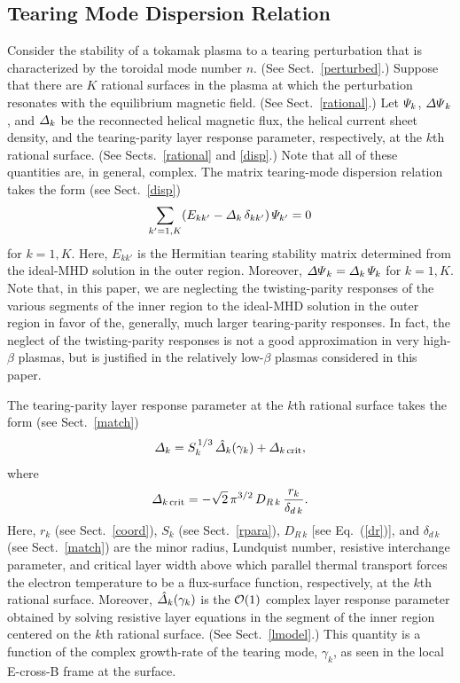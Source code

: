 \documentclass[12pt,prb,aps]{revtex4-1}
\begin{document}
\subsection{Tearing Mode Dispersion Relation}
Consider the stability of a tokamak plasma to a tearing perturbation that is characterized by the toroidal mode number $n$. (See Sect.~\ref{perturbed}.)
Suppose that there are $K$ rational surfaces in the plasma at which the perturbation resonates with the equilibrium magnetic field. (See Sect.~\ref{rational}.)
Let ${\mit\Psi}_k$, ${\mit\Delta\Psi}_k$, and ${\mit\Delta}_k$ be the reconnected helical magnetic flux, the helical current sheet density, and the
tearing-parity layer response parameter, respectively, at the $k$th rational surface. (See Sects.~\ref{rational} and \ref{disp}.) Note that all of these
quantities are, in general, complex. The matrix tearing-mode dispersion relation takes the form (see Sect.~\ref{disp}) 
\begin{equation}\label{tmdisp}
\sum_{k'=1,K}(E_{kk'}-{\mit\Delta}_k\,\delta_{kk'})\,{\mit\Psi}_{k'} = 0
\end{equation}
for $k=1,K$. Here, $E_{kk'}$ is the Hermitian tearing stability matrix determined from the ideal-MHD solution in the outer region. 
Moreover, ${\mit\Delta\Psi}_k = {\mit\Delta}_k\,{\mit\Psi}_k$ for $k=1,K$. Note that, in this paper, we are neglecting the twisting-parity responses of the
various segments of the inner region to the ideal-MHD solution in the outer region in favor of the, generally, much larger tearing-parity responses.\cite{am3}
In fact, the neglect of the twisting-parity responses   is not a good approximation in very high-$\beta$ plasmas,\cite{bren2} but is justified in the relatively low-$\beta$
plasmas considered in this paper. 

The tearing-parity layer response parameter at the $k$th rational surface takes the form (see Sect.~\ref{match})
\begin{equation}
{\mit\Delta}_k = S_k^{\,1/3}\,\hat{\mit\Delta}_k(\gamma_k) + {\mit\Delta}_{k\,{\rm crit}},
\end{equation}
where
\begin{equation}\label{dcrit}
{\mit\Delta}_{k\,{\rm crit}} =- \sqrt{2}\,\pi^{3/2}\,D_{R\,k}\,\frac{r_k}{\delta_{d\,k}}.
\end{equation}
Here, $r_k$ (see Sect.~\ref{coord}), $S_k$ (see Sect.~\ref{rpara}), $D_{R\,k}$ [see Eq.~(\ref{dr})], and $\delta_{d\,k}$ (see Sect.~\ref{match}) are the minor radius,  Lundquist number, resistive interchange parameter, and critical layer width above
which parallel thermal transport forces the electron temperature to be a flux-surface function, respectively, at the $k$th rational surface.  Moreover, $\hat{\mit\Delta}_k(\gamma_k)$ is
the ${\cal O}(1)$ complex layer response parameter obtained by solving  resistive layer equations in the segment of the inner region centered on the $k$th rational
surface. (See Sect.~\ref{lmodel}.) This quantity is a function of the complex growth-rate of the tearing mode, $\gamma_k$,  as seen in the local E-cross-B frame at the surface. 
\end{document}
